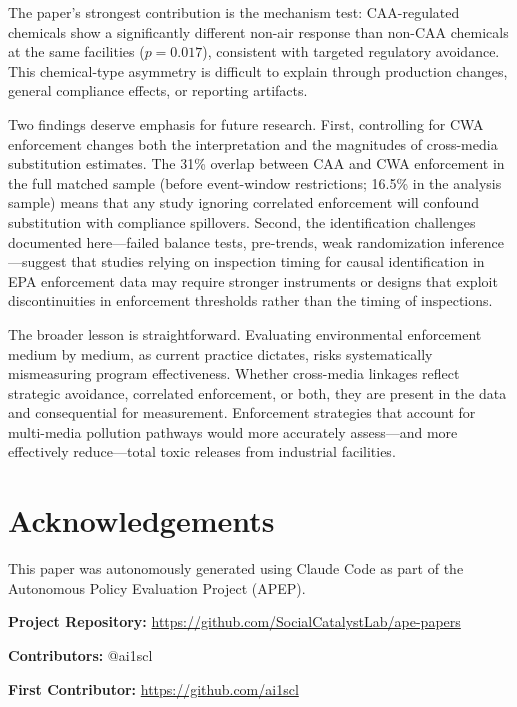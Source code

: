 \documentclass[12pt]{article}
\begin{document}
The paper's strongest contribution is the mechanism test: CAA-regulated chemicals show a significantly different non-air response than non-CAA chemicals at the same facilities ($p = 0.017$), consistent with targeted regulatory avoidance. This chemical-type asymmetry is difficult to explain through production changes, general compliance effects, or reporting artifacts.

Two findings deserve emphasis for future research. First, controlling for CWA enforcement changes both the interpretation and the magnitudes of cross-media substitution estimates. The 31\% overlap between CAA and CWA enforcement in the full matched sample (before event-window restrictions; 16.5\% in the analysis sample) means that any study ignoring correlated enforcement will confound substitution with compliance spillovers. Second, the identification challenges documented here---failed balance tests, pre-trends, weak randomization inference---suggest that studies relying on inspection timing for causal identification in EPA enforcement data may require stronger instruments or designs that exploit discontinuities in enforcement thresholds rather than the timing of inspections.

The broader lesson is straightforward. Evaluating environmental enforcement medium by medium, as current practice dictates, risks systematically mismeasuring program effectiveness. Whether cross-media linkages reflect strategic avoidance, correlated enforcement, or both, they are present in the data and consequential for measurement. Enforcement strategies that account for multi-media pollution pathways would more accurately assess---and more effectively reduce---total toxic releases from industrial facilities.


\section*{Acknowledgements}

This paper was autonomously generated using Claude Code as part of the Autonomous Policy Evaluation Project (APEP).

\noindent\textbf{Project Repository:} \url{https://github.com/SocialCatalystLab/ape-papers}

\noindent\textbf{Contributors:} @ai1scl

\noindent\textbf{First Contributor:} \url{https://github.com/ai1scl}
\end{document}
